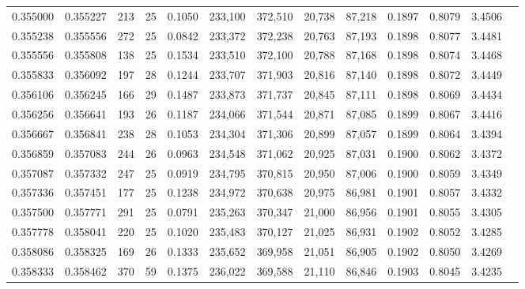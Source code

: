 \begin{tabular}{rrrrrrrrrrrrr}
0.355000 & 0.355227 &    213 &    25 &                                     0.1050 & 233,100 & 372,510 &  20,738 &  87,218 & 0.1897 & 0.8079 & 3.4506 \\
0.355238 & 0.355556 &    272 &    25 &                                     0.0842 & 233,372 & 372,238 &  20,763 &  87,193 & 0.1898 & 0.8077 & 3.4481 \\
0.355556 & 0.355808 &    138 &    25 &                                     0.1534 & 233,510 & 372,100 &  20,788 &  87,168 & 0.1898 & 0.8074 & 3.4468 \\
0.355833 & 0.356092 &    197 &    28 &                                     0.1244 & 233,707 & 371,903 &  20,816 &  87,140 & 0.1898 & 0.8072 & 3.4449 \\
0.356106 & 0.356245 &    166 &    29 &                                     0.1487 & 233,873 & 371,737 &  20,845 &  87,111 & 0.1898 & 0.8069 & 3.4434 \\
0.356256 & 0.356641 &    193 &    26 &                                     0.1187 & 234,066 & 371,544 &  20,871 &  87,085 & 0.1899 & 0.8067 & 3.4416 \\
0.356667 & 0.356841 &    238 &    28 &                                     0.1053 & 234,304 & 371,306 &  20,899 &  87,057 & 0.1899 & 0.8064 & 3.4394 \\
0.356859 & 0.357083 &    244 &    26 &                                     0.0963 & 234,548 & 371,062 &  20,925 &  87,031 & 0.1900 & 0.8062 & 3.4372 \\
0.357087 & 0.357332 &    247 &    25 &                                     0.0919 & 234,795 & 370,815 &  20,950 &  87,006 & 0.1900 & 0.8059 & 3.4349 \\
0.357336 & 0.357451 &    177 &    25 &                                     0.1238 & 234,972 & 370,638 &  20,975 &  86,981 & 0.1901 & 0.8057 & 3.4332 \\
0.357500 & 0.357771 &    291 &    25 &                                     0.0791 & 235,263 & 370,347 &  21,000 &  86,956 & 0.1901 & 0.8055 & 3.4305 \\
0.357778 & 0.358041 &    220 &    25 &                                     0.1020 & 235,483 & 370,127 &  21,025 &  86,931 & 0.1902 & 0.8052 & 3.4285 \\
0.358086 & 0.358325 &    169 &    26 &                                     0.1333 & 235,652 & 369,958 &  21,051 &  86,905 & 0.1902 & 0.8050 & 3.4269 \\
0.358333 & 0.358462 &    370 &    59 &                                     0.1375 & 236,022 & 369,588 &  21,110 &  86,846 & 0.1903 & 0.8045 & 3.4235 \\

\end{tabular}
